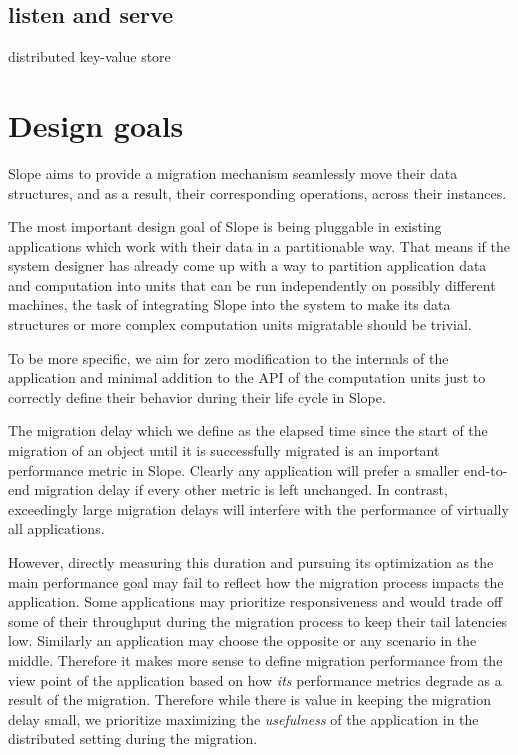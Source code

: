 \subsection{listen and serve}
distributed key-value store


\section{Design goals}

Slope aims to provide a migration mechanism 
seamlessly move their data structures, and as a result, their corresponding
operations, across their instances.

The most important design goal of Slope is being pluggable in existing
applications which work with their data in a partitionable way. That means if
the system designer has already come up with a way to partition
application data and computation into units that can be run independently on 
possibly different machines, the task of integrating Slope into the system
to make its data
structures or more complex computation units migratable should be trivial.

To be more specific, we aim for zero modification to the internals of the
application and minimal addition to the API of the computation units just to
correctly define their behavior during their life cycle in Slope.

The migration delay which we define as the elapsed time since the start of the
migration of an object until it is successfully migrated is an important
performance metric in Slope. Clearly any application will prefer a smaller
end-to-end migration delay if every other metric is left unchanged. In contrast,
exceedingly large migration delays will interfere with the performance of
virtually all applications.

However, directly measuring this duration and pursuing its optimization
as the main performance goal may fail
\CHECK{} to reflect how the migration process impacts the application. Some
applications may prioritize responsiveness and would trade off some of their
throughput during the migration process to keep their tail latencies low.
Similarly an application may choose the opposite or any scenario in the middle.
Therefore it makes more sense to define migration performance from the view
point of the application based on how \emph{its} performance metrics degrade
as a result of the migration. Therefore while there is value in keeping the
migration delay small, we prioritize maximizing the \emph{usefulness} of the
application in the distributed setting during the migration.


